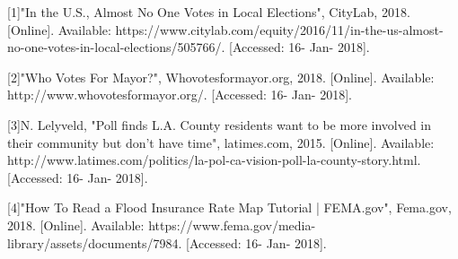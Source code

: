 \documentclass[12pt]{article}
\begin{document}
 

[1]"In the U.S., Almost No One Votes in Local Elections", CityLab, 2018. [Online]. Available: https://www.citylab.com/equity/2016/11/in-the-us-almost-no-one-votes-in-local-elections/505766/. [Accessed: 16- Jan- 2018].

 

[2]"Who Votes For Mayor?", Whovotesformayor.org, 2018. [Online]. Available: http://www.whovotesformayor.org/. [Accessed: 16- Jan- 2018].

 

 

[3]N. Lelyveld, "Poll finds L.A. County residents want to be more involved in their community but don't have time", latimes.com, 2015. [Online]. Available: http://www.latimes.com/politics/la-pol-ca-vision-poll-la-county-story.html. [Accessed: 16- Jan- 2018].

 

[4]"How To Read a Flood Insurance Rate Map Tutorial | FEMA.gov", Fema.gov, 2018. [Online]. Available: https://www.fema.gov/media-library/assets/documents/7984. [Accessed: 16- Jan- 2018].

 




\end{document}
